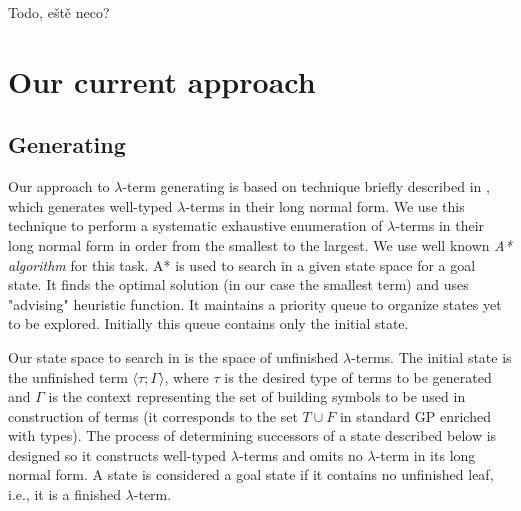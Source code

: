 \documentclass[11pt]{article}
\newcommand{\lterm}{$\lambda$-term\xspace}
\newcommand{\lterms}{$\lambda$-terms\xspace}
\newcommand{\ul}[2]{\langle #1 ; #2 \rangle}
\newcommand{\red}[1]{{\color{red} #1}}
\begin{document}
\begin{article}

\red{Todo, eště neco?}

\section{Our current approach}

\subsection{Generating}

Our approach to \lterm generating is based on technique 
briefly described in \citep{barendregt10}, which generates
well-typed \lterms in their long normal form. 
We use this technique to perform a systematic exhaustive enumeration
of \lterms in their long normal form in order from the smallest to the largest.
We use well known \textit{A* algorithm} \citep{AIMA} for this task.
A* is used to search in a given state space for a goal state. 
It finds the optimal solution (in our case the smallest term)
and uses "advising" heuristic function.
It maintains a priority queue to organize states yet to be explored.
Initially this queue contains only the initial state.  

Our state space to search in is the space of unfinished \lterms. 
The initial state is the unfinished term $\ul{\tau}{\Gamma}$, 
where $\tau$ is the desired type of
terms to be generated and $\Gamma$ is the context
representing the set of building symbols to be used in construction of
terms (it corresponds to the set $T \cup F$ in
standard GP enriched with types). The process of determining 
successors of a state described below is designed so it constructs well-typed 
\lterms and omits no \lterm in its long normal form. 
A state is considered a goal state if it contains no unfinished
leaf, i.e., it is a finished \lterm.


\end{article}
\end{document}

